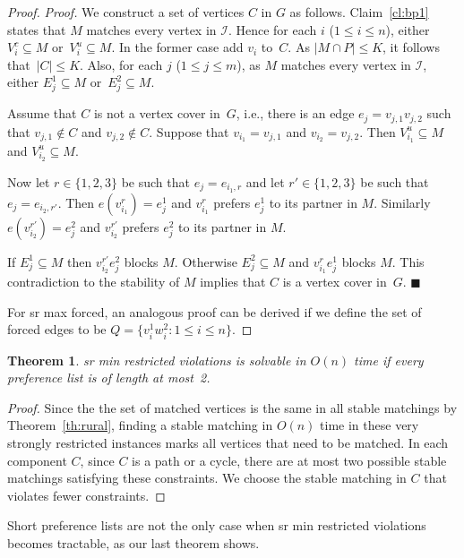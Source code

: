 \documentclass[preprint,12pt]{elsarticle}
\newcommand{\myqed}{$\blacksquare$}
\newcommand{\myproof}{\noindent\textit{Proof. }}
\newtheorem{theorem}{Theorem}[section]
\begin{document}
\begin{proof}
	\myproof We construct a set of vertices $C$ in $G$ as follows. Claim~\ref{cl:bp1} states that $M$ matches every vertex in $\mathcal{I}$.  Hence for each $i$ ($1\leq i\leq n$), either $V_i^c\subseteq M$ or~$V_i^u\subseteq M$. In the former case add $v_i$ to~$C$. As $|M\cap P|\leq K$, it follows that~$|C|\leq K$. Also, for each $j$ ($1\leq j\leq m$), as $M$ matches every vertex in $\mathcal{I}$, either $E_j^1\subseteq M$ or~$E_j^2\subseteq M$. 

	Assume that $C$ is not a vertex cover in~$G$, i.e., there is an edge $e_j = v_{j,1} v_{j,2}$ such that $v_{j,1}\notin C$ and $v_{j,2}\notin C$.  Suppose that $v_{i_1}=v_{j,1}$ and $v_{i_2}=v_{j,2}$.  Then $V_{i_1}^u\subseteq M$ and $V_{i_2}^u\subseteq M$.
    
    Now let $r\in \{1,2,3\}$ be such that $e_j=e_{i_1,r}$ and let $r'\in \{1,2,3\}$ be such that $e_j=e_{i_2,r'}$.  Then $e(v_{i_1}^r)=e_j^1$ and $v_{i_1}^r$ prefers $e_j^1$ to its partner in $M$.  Similarly $e(v_{i_2}^{r'})=e_j^2$ and $v_{i_2}^{r'}$ prefers $e_j^2$ to its partner in $M$.
    
    If $E_j^1\subseteq M$ then $v_{i_2}^{r'}e_j^2$ blocks $M$.  Otherwise $E_j^2\subseteq M$ and $v_{i_1}^{r}e_j^1$ blocks $M$.  This contradiction to the stability of $M$ implies that $C$ is a vertex cover in~$G$.  \myqed


	For {\sc sr max forced}, an analogous proof can be derived if we define the set of forced edges to be $Q=\{v_i^1 w_i^2 : 1\leq i\leq n\}$.
\end{proof}

\begin{theorem}
\label{srminrest2}
	{\sc sr min restricted violations} is solvable in $O(n)$ time if every preference list is of length at most~2.
\end{theorem}

\begin{proof}
    Since the the set of matched vertices is the same in all stable matchings by Theorem~\ref{th:rural}, finding a stable matching in $O(n)$ time in these very strongly restricted instances marks all vertices that need to be matched. In each component $C$, since $C$ is a path or a cycle, there are at most two possible stable matchings satisfying these constraints. We choose the stable matching in $C$ that violates fewer constraints.\end{proof}

Short preference lists are not the only case when {\sc sr min restricted violations} becomes tractable, as our last theorem shows.
    
\end{document}
